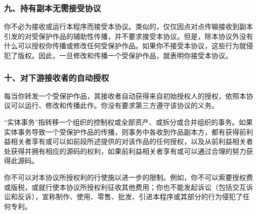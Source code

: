 \subsubsection{九、持有副本无需接受协议}
你不必为接收或运行本程序而接受本协议。类似的，仅仅因点对点传输接收到副本引发的对受保护作品的辅助性传播，并不要求接受本协议。但是，除本协议外没有什么可以授权你传播或修改任何受保护作品。如果你不接受本协议，这些行为就侵犯了版权。因此，一旦修改和传播一个受保护作品，就表明你接受本协议。
\subsubsection{十、对下游接收者的自动授权}
每当你转发一个受保护作品，其接收者自动获得来自初始授权人的授权，依照本协议可以运行、修改和传播此作。你没有要求第三方遵守该协议的义务。\par
“实体事务”指转移一个组织的控制权或全部资产、或拆分或合并组织的事务。如果实体事务导致一个受保护作品的传播，则事务中各收到作品副本方，都有获得前利益相关者享有或可以如前段所述提供的对该作品的任何授权，以及从前利益相关者处获得并拥有相应的源码的权利，如果前利益相关者享有或可以通过合理的努力获得此源码。\par
你不可以对本协议所授权利的行使施以进一步的限制。例如，你不可以索要授权费或版税，或就行使本协议所授权利征收其他费用；你也不能发起诉讼（包括交互诉讼和反诉），宣称制作、使用、零售、批发、引进本程序或其部分的行为侵犯了任何专利。
